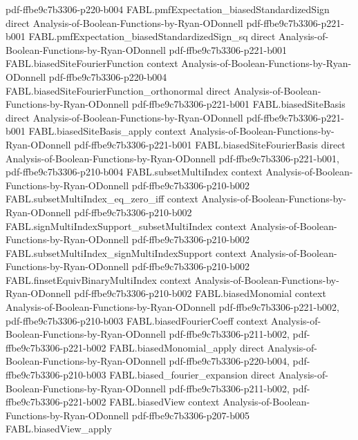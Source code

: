 \begin{theorem}
  {pdf-ffbe9c7b3306-p220-b004}
\proofstep
  {FABL.pmfExpectation_biasedStandardizedSign}
  {direct}
  {Analysis-of-Boolean-Functions-by-Ryan-ODonnell}
  {pdf-ffbe9c7b3306-p221-b001}
\proofstep
  {FABL.pmfExpectation_biasedStandardizedSign_sq}
  {direct}
  {Analysis-of-Boolean-Functions-by-Ryan-ODonnell}
  {pdf-ffbe9c7b3306-p221-b001}
\proofstep
  {FABL.biasedSiteFourierFunction}
  {context}
  {Analysis-of-Boolean-Functions-by-Ryan-ODonnell}
  {pdf-ffbe9c7b3306-p220-b004}
\proofstep
  {FABL.biasedSiteFourierFunction_orthonormal}
  {direct}
  {Analysis-of-Boolean-Functions-by-Ryan-ODonnell}
  {pdf-ffbe9c7b3306-p221-b001}
\proofstep
  {FABL.biasedSiteBasis}
  {direct}
  {Analysis-of-Boolean-Functions-by-Ryan-ODonnell}
  {pdf-ffbe9c7b3306-p221-b001}
\proofstep
  {FABL.biasedSiteBasis_apply}
  {context}
  {Analysis-of-Boolean-Functions-by-Ryan-ODonnell}
  {pdf-ffbe9c7b3306-p221-b001}
\proofstep
  {FABL.biasedSiteFourierBasis}
  {direct}
  {Analysis-of-Boolean-Functions-by-Ryan-ODonnell}
  {pdf-ffbe9c7b3306-p221-b001,
    pdf-ffbe9c7b3306-p210-b004}
\proofstep
  {FABL.subsetMultiIndex}
  {context}
  {Analysis-of-Boolean-Functions-by-Ryan-ODonnell}
  {pdf-ffbe9c7b3306-p210-b002}
\proofstep
  {FABL.subsetMultiIndex_eq_zero_iff}
  {context}
  {Analysis-of-Boolean-Functions-by-Ryan-ODonnell}
  {pdf-ffbe9c7b3306-p210-b002}
\proofstep
  {FABL.signMultiIndexSupport_subsetMultiIndex}
  {context}
  {Analysis-of-Boolean-Functions-by-Ryan-ODonnell}
  {pdf-ffbe9c7b3306-p210-b002}
\proofstep
  {FABL.subsetMultiIndex_signMultiIndexSupport}
  {context}
  {Analysis-of-Boolean-Functions-by-Ryan-ODonnell}
  {pdf-ffbe9c7b3306-p210-b002}
\proofstep
  {FABL.finsetEquivBinaryMultiIndex}
  {context}
  {Analysis-of-Boolean-Functions-by-Ryan-ODonnell}
  {pdf-ffbe9c7b3306-p210-b002}
\proofstep
  {FABL.biasedMonomial}
  {context}
  {Analysis-of-Boolean-Functions-by-Ryan-ODonnell}
  {pdf-ffbe9c7b3306-p221-b002,
    pdf-ffbe9c7b3306-p210-b003}
\proofstep
  {FABL.biasedFourierCoeff}
  {context}
  {Analysis-of-Boolean-Functions-by-Ryan-ODonnell}
  {pdf-ffbe9c7b3306-p211-b002,
    pdf-ffbe9c7b3306-p221-b002}
\proofstep
  {FABL.biasedMonomial_apply}
  {direct}
  {Analysis-of-Boolean-Functions-by-Ryan-ODonnell}
  {pdf-ffbe9c7b3306-p220-b004,
    pdf-ffbe9c7b3306-p210-b003}
\proofstep
  {FABL.biased_fourier_expansion}
  {direct}
  {Analysis-of-Boolean-Functions-by-Ryan-ODonnell}
  {pdf-ffbe9c7b3306-p211-b002,
    pdf-ffbe9c7b3306-p221-b002}
\proofstep
  {FABL.biasedView}
  {context}
  {Analysis-of-Boolean-Functions-by-Ryan-ODonnell}
  {pdf-ffbe9c7b3306-p207-b005}
\proofstep
  {FABL.biasedView_apply}

\end{theorem}
